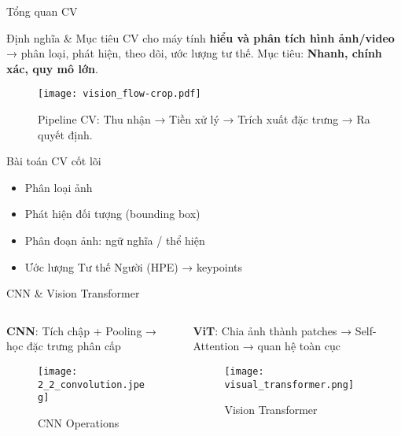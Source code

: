 

\begin{frame}{Tổng quan CV}
\begin{block}{Định nghĩa \& Mục tiêu}
CV cho máy tính \textbf{hiểu và phân tích hình ảnh/video} → phân loại, phát hiện, theo dõi, ước lượng tư thế.  
Mục tiêu: \textbf{Nhanh, chính xác, quy mô lớn}.
\end{block}
\begin{figure}
    \centering
    \texttt{[image: vision\_flow-crop.pdf]}
    \caption{Pipeline CV: Thu nhận → Tiền xử lý → Trích xuất đặc trưng → Ra quyết định.}
\end{figure}
\end{frame}

\begin{frame}{Bài toán CV cốt lõi}
\begin{itemize}
    \item Phân loại ảnh
    \item Phát hiện đối tượng (bounding box)
    \item Phân đoạn ảnh: ngữ nghĩa / thể hiện
    \item Ước lượng Tư thế Người (HPE) → keypoints
\end{itemize}
\end{frame}

\begin{frame}{CNN \& Vision Transformer}
\begin{columns}[T]
\begin{column}{0.5\textwidth}
\textbf{CNN}: Tích chập + Pooling → học đặc trưng phân cấp
\begin{figure}
\centering
\texttt{[image: 2\_2\_convolution.jpeg]}
\caption{CNN Operations}
\end{figure}
\end{column}
\begin{column}{0.5\textwidth}
\textbf{ViT}: Chia ảnh thành patches → Self-Attention → quan hệ toàn cục
\begin{figure}
\centering
\texttt{[image: visual\_transformer.png]}
\caption{Vision Transformer}
\end{figure}
\end{column}
\end{columns}
\end{frame}

